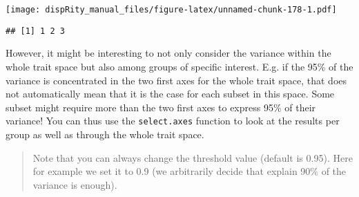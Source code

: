 \documentclass[
]{book}
\newenvironment{Shaded}{\begin{snugshade}}{\end{snugshade}}
\newcommand{\DocumentationTok}[1]{\textcolor[rgb]{0.56,0.35,0.01}{\textbf{\textit{#1}}}}
\newcommand{\NormalTok}[1]{#1}
\newcommand{\SpecialCharTok}[1]{\textcolor[rgb]{0.81,0.36,0.00}{\textbf{#1}}}
\begin{document}
\texttt{[image: dispRity\_manual\_files/figure-latex/unnamed-chunk-178-1.pdf]}

\begin{Shaded}
\end{Shaded}

\begin{verbatim}
## [1] 1 2 3
\end{verbatim}

However, it might be interesting to not only consider the variance within the whole trait space but also among groups of specific interest.
E.g. if the 95\% of the variance is concentrated in the two first axes for the whole trait space, that does not automatically mean that it is the case for each subset in this space. Some subset might require more than the two first axes to express 95\% of their variance!
You can thus use the \texttt{select.axes} function to look at the results per group as well as through the whole trait space.

\begin{quote}
Note that you can always change the threshold value (default is 0.95). Here for example we set it to 0.9 (we arbitrarily decide that explain 90\% of the variance is enough).
\end{quote}
\end{document}
